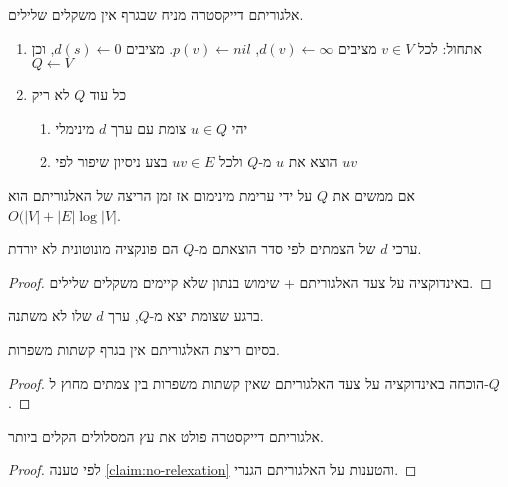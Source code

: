 אלגוריתם דייקסטרה מניח שבגרף אין משקלים שלילים.

\begin{enumerate}
\item
אתחול: לכל
$v \in V$
מציבים 
$d(v) \leftarrow \infty$, 
$p(v) \leftarrow nil$.
מציבים
$d(s) \leftarrow 0$, 
וכן 
$Q \leftarrow V$
\item
כל עוד $Q$ לא ריק
	\begin{enumerate}
	\item
	יהי 
	$u \in Q$
	צומת עם ערך $d$ מינימלי
	\item
	הוצא את $u$ מ-$Q$ ולכל 
	$uv \in E$
	בצע ניסיון שיפור לפי
	$uv$
	\end{enumerate}
\end{enumerate}

אם ממשים את $Q$ על ידי ערימת מינימום אז זמן הריצה של האלגוריתם הוא 
$O(|V| + |E|\log|V|$.

\begin{claim}
ערכי $d$ של הצמתים לפי סדר הוצאתם מ-$Q$ הם פונקציה מונוטונית לא יורדת.
\end{claim}

\begin{proof}
באינדוקציה על צעד האלגוריתם + שימוש בנתון שלא קיימים משקלים שלילים.
\end{proof}

\begin{corollary}
ברגע שצומת יצא מ-$Q$, ערך $d$ שלו לא משתנה.
\end{corollary}

\begin{claim}
\label{claim:no-relexation}
בסיום ריצת האלגוריתם אין בגרף קשתות משפרות.
\end{claim}
\begin{proof}
הוכחה באינדוקציה על צעד האלגוריתם שאין קשתות משפרות בין צמתים מחוץ ל-$Q$.
\end{proof}

\begin{theorem}
אלגוריתם דייקסטרה פולט את עץ המסלולים הקלים ביותר.
\end{theorem}
\begin{proof}
לפי טענה
\ref{claim:no-relexation}
והטענות על האלגוריתם הגנרי.
\end{proof}



